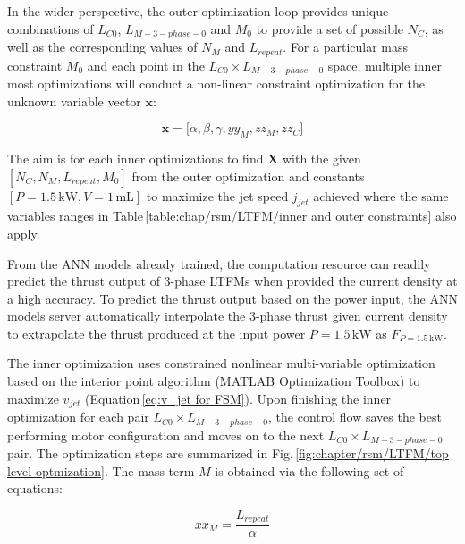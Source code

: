     
                In the wider perspective, the outer optimization loop provides unique combinations of $L_{C0}$, $L_{M-3-phase-0}$ and $M_0$ to provide a set of possible $N_C$, as well as the corresponding values of $N_M$ and $L_{repeat}$. For a particular mass constraint $M_0$ and each point in the $L_{C0}\times L_{M-3-phase-0}$ space, multiple inner most optimizations will conduct a non-linear constraint optimization for the unknown variable vector $\textbf{x}$:
                
                
                \begin{equation}
                    \textbf{x} = \big[ \alpha,\beta,\gamma, yy_M, zz_M, zz_C \big]
                    \label{eq:chap/rsm/LTFM/optimization output}
                \end{equation}
                
                
                The aim is for each inner optimizations to find $\textbf{X}$ with the given $[N_C,N_M,L_{repeat},M_0]$ from the outer optimization and constants $[P=1.5\,\mathrm{kW},V=1\,\mathrm{mL}]$ to maximize the jet speed $j_{jet}$ achieved where the same variables ranges in Table\,\ref{table:chap/rsm/LTFM/inner and outer constraints} also apply. 
                
                
                From the \acs{ANN} models already trained, the computation resource can readily predict the thrust output of 3-phase \acsp{LTFM} when provided the current density at a high accuracy. To predict the thrust output based on the power input, the \acs{ANN} models server automatically interpolate the 3-phase thrust given current density to extrapolate the thrust produced at the input power $P=1.5\,\mathrm{kW}$ as $F_{P=1.5\,\mathrm{kW}}$.
                
                
                The inner optimization uses constrained nonlinear multi-variable optimization based on the interior point algorithm (MATLAB Optimization Toolbox) to maximize $v_{jet}$ (Equation\,\ref{eq:v_jet for FSM}). Upon finishing the inner optimization for each pair $L_{C0}\times L_{M-3-phase-0}$, the control flow saves the best performing motor configuration and moves on to the next $L_{C0}\times L_{M-3-phase-0}$ pair. The optimization steps are summarized in Fig.\,\ref{fig:chapter/rsm/LTFM/top level optmization}. The mass term $M$ is obtained via the following set of equations:
                
                
                    \begin{equation}
                        xx_M = \frac{L_{repeat}}{\alpha}
                        \label{eq:chap/rsm/LTFM/mass/xx_m}
                    \end{equation}
                    
